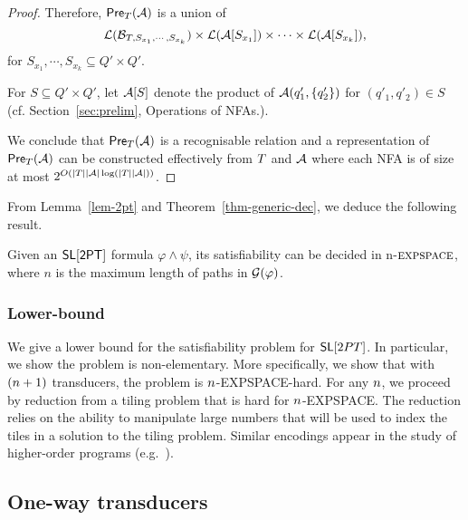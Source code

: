 \begin{proof}
\medskip

Therefore, $\textsf{Pre}_{T}(\mathcal{A})$ is a union of
\[\mathcal{L}(\mathcal{B}_{T, S_{x_1}, \cdots, S_{x_k}}) \times \mathcal{L}(\mathcal{A}[S_{x_1}]) \times \cdots  \times \mathcal{L}(\mathcal{A}[S_{x_k}]), \]
for $S_{x_1}, \cdots, S_{x_k} \subseteq Q' \times Q'$. 

For $S \subseteq Q' \times Q'$, let $\mathcal{A}[S]$ denote the product of $\mathcal{A}(q'_1, \{q'_2\})$ for $(q'_1,q'_2) \in S$ (cf. Section~\ref{sec:prelim}, {Operations of NFAs.}).

We conclude that $\textsf{Pre}_{T}(\mathcal{A})$ is a recognisable relation and a representation of $\textsf{Pre}_{T}(\mathcal{A})$ can be constructed effectively from $T$ and $\mathcal{A}$ where each NFA is of size at most $2^{O(|T||\mathcal{A}|\log (|T||\mathcal{A}|))}$.
\end{proof}

From Lemma~\ref{lem-2pt} and Theorem~\ref{thm-generic-dec}, we deduce the following result.
%
\begin{corollary}
Given an $\textsf{SL}[\textsf{2PT}]$ formula $\varphi \wedge \psi$, its satisfiability can be decided in n-$\textsc{expspace}$, where $n$ is the maximum length of paths in $\mathcal{G}(\varphi)$. 
\end{corollary}


\subsubsection{Lower-bound}

We give a lower bound for the satisfiability problem for $\mathsf{SL}[2PT]$. 
In particular, we show the problem is non-elementary.
More specifically, we show that with $(n+1)$ transducers, the problem is $n$-EXPSPACE-hard.
For any $n$, we proceed by reduction from a tiling problem that is hard for $n$-EXPSPACE.
The reduction relies on the ability to manipulate large numbers that will be used to index the tiles in a solution to the tiling problem.
Similar encodings appear in the study of higher-order programs (e.g.~\cite{J01,CW07}).


%


\subsection{One-way transducers}


